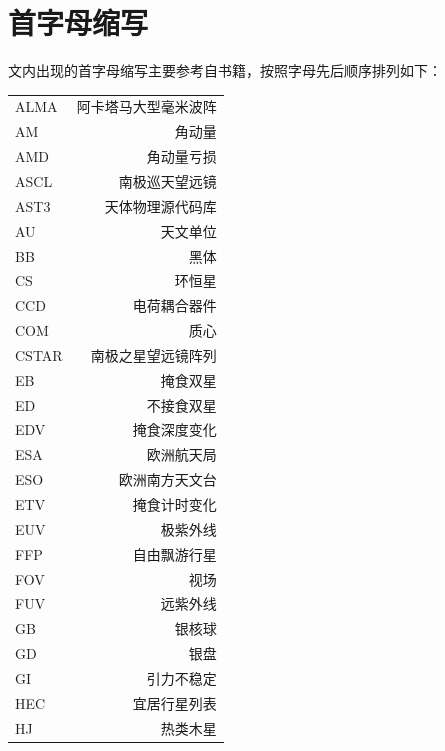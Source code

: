 \section{首字母缩写}  \label{apdx:acronym}
文内出现的首字母缩写主要参考自书籍，按照字母先后顺序排列如下：
\begin{multicols}{2}
\begin{tabularx}{0.85\linewidth}{@{\extracolsep{\fill}}lr}
\centering
ALMA		&   阿卡塔马大型毫米波阵		\\ 
AM			&   角动量					\\ 
AMD			&   角动量亏损				\\ 
ASCL		&   南极巡天望远镜			\\  
AST3		&   天体物理源代码库		\\  
AU			&   天文单位				\\
BB			&   黑体					\\
CS 			&   环恒星					\\
CCD			&   电荷耦合器件			\\
COM			&   质心					\\
CSTAR		&   南极之星望远镜阵列		\\  
EB			&   掩食双星				\\ 
ED			&   不接食双星				\\ 
EDV			&   掩食深度变化			\\
ESA 			&   欧洲航天局				\\
ESO 		&   欧洲南方天文台			\\
ETV			&   掩食计时变化			\\
EUV			&   极紫外线				\\ 
FFP			&   自由飘游行星			\\ 
FOV			&   视场					\\ 
FUV			&   远紫外线				\\ 
GB			&   银核球					\\
GD			&   银盘					\\
GI			&   引力不稳定				\\
HEC			&    宜居行星列表			\\
HJ			&   热类木星				
\end{tabularx}
\columnbreak


\end{multicols}

